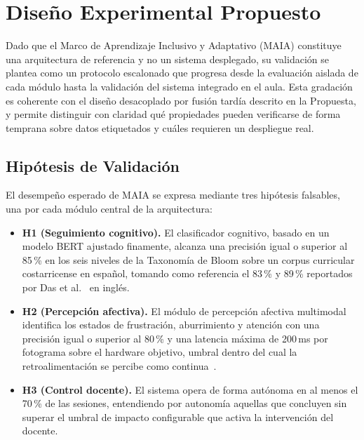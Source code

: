 \section{Diseño Experimental Propuesto}

Dado que el Marco de Aprendizaje Inclusivo y Adaptativo (MAIA) constituye una
arquitectura de referencia y no un sistema desplegado, su validación se plantea
como un protocolo escalonado que progresa desde la evaluación aislada de cada
módulo hasta la validación del sistema integrado en el aula. Esta gradación es
coherente con el diseño desacoplado por fusión tardía descrito en la Propuesta,
y permite distinguir con claridad qué propiedades pueden verificarse de forma
temprana sobre datos etiquetados y cuáles requieren un despliegue real.

\subsection{Hipótesis de Validación}

El desempeño esperado de MAIA se expresa mediante tres hipótesis falsables, una
por cada módulo central de la arquitectura:

\begin{itemize}
    \item \textbf{H1 (Seguimiento cognitivo).} El clasificador cognitivo,
    basado en un modelo BERT ajustado finamente, alcanza una precisión igual o
    superior al 85\,\% en los seis niveles de la Taxonomía de Bloom sobre un
    corpus curricular costarricense en español, tomando como referencia el
    83\,\% y 89\,\% reportados por Das et al.~\cite{Das2020} en inglés.

    \item \textbf{H2 (Percepción afectiva).} El módulo de percepción afectiva
    multimodal identifica los estados de frustración, aburrimiento y atención
    con una precisión igual o superior al 80\,\% y una latencia máxima de
    200\,ms por fotograma sobre el hardware objetivo, umbral dentro del cual la
    retroalimentación se percibe como continua~\cite{AISTY2024}.

    \item \textbf{H3 (Control docente).} El sistema opera de forma autónoma en
    al menos el 70\,\% de las sesiones, entendiendo por autonomía aquellas que
    concluyen sin superar el umbral de impacto configurable que activa la
    intervención del docente.
\end{itemize}

